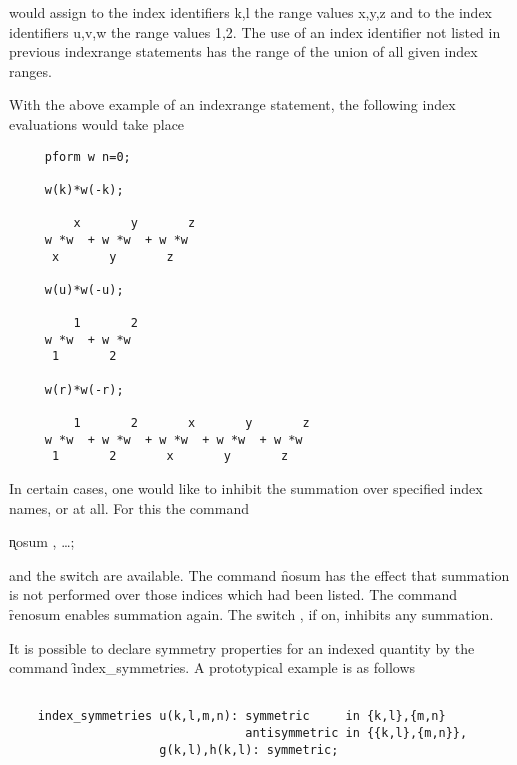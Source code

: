 would assign to the index identifiers k,l the range values x,y,z and
to the index identifiers u,v,w the range values 1,2. The use of an
index identifier not listed in previous indexrange statements has the
range of the union of all given index ranges.

With the above example of an indexrange statement, the following
index evaluations would take place

\begin{verbatim}
     pform w n=0;

     w(k)*w(-k);

         x       y       z
     w *w  + w *w  + w *w
      x       y       z

     w(u)*w(-u);

         1       2
     w *w  + w *w
      1       2

     w(r)*w(-r);

         1       2       x       y       z
     w *w  + w *w  + w *w  + w *w  + w *w
      1       2       x       y       z
\end{verbatim}

In certain cases, one would like to inhibit the summation over
specified index names, or at all.  For this the command

\hypertarget{command:NOSUM}{}
\hspace*{2em} \k{nosum} , \ldots;\label{NOSUM}

and the switch  are
\hypertarget{command:RENOSUM}{}
\hypertarget{switch:NOSUM}{}
available.  The command \f{nosum} has the effect that summation is
not performed over those indices which had been listed.  The command
\f{renosum}\label{RENOSUM} enables summation again.  The switch ,
if on, inhibits any summation. 

\label{INDEXSYMMETRIES} 
\hypertarget{command:INDEX_SYMMETRIES}{}
It is possible to declare symmetry properties for an indexed quantity by
the command \f{index\_symmetries}. A prototypical example is as
follows

\begin{verbatim}

    index_symmetries u(k,l,m,n): symmetric     in {k,l},{m,n}
                                 antisymmetric in {{k,l},{m,n}},
                     g(k,l),h(k,l): symmetric;

\end{verbatim}

